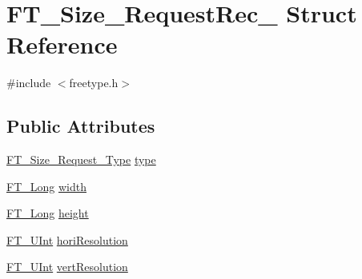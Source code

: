 \hypertarget{struct_f_t___size___request_rec__}{\section{F\-T\-\_\-\-Size\-\_\-\-Request\-Rec\-\_\- Struct Reference}
\label{struct_f_t___size___request_rec__}
}


{\ttfamily \#include $<$freetype.\-h$>$}

\subsection*{Public Attributes}
\begin{DoxyCompactItemize}
\item 
\hyperlink{freetype_8h_ac10a6bdce0674edb378e81f8a19b6867}{F\-T\-\_\-\-Size\-\_\-\-Request\-\_\-\-Type} \hyperlink{struct_f_t___size___request_rec___a7644b04dd2b26c0698df558775320494}{type}
\item 
\hyperlink{fttypes_8h_a7fa72a1f0e79fb1860c5965789024d6f}{F\-T\-\_\-\-Long} \hyperlink{struct_f_t___size___request_rec___a7b044d36af318b053d5e3939eb0d5039}{width}
\item 
\hyperlink{fttypes_8h_a7fa72a1f0e79fb1860c5965789024d6f}{F\-T\-\_\-\-Long} \hyperlink{struct_f_t___size___request_rec___af8142450d8d032e1870d758cdcfa51a9}{height}
\item 
\hyperlink{fttypes_8h_abcb8db4dbf35d2b55a9e8c7b0926dc52}{F\-T\-\_\-\-U\-Int} \hyperlink{struct_f_t___size___request_rec___a3a85704d13561d9db53aa60f7805ec73}{hori\-Resolution}
\item 
\hyperlink{fttypes_8h_abcb8db4dbf35d2b55a9e8c7b0926dc52}{F\-T\-\_\-\-U\-Int} \hyperlink{struct_f_t___size___request_rec___a86601c38d91064b6efe256a9e99c56f4}{vert\-Resolution}
\end{DoxyCompactItemize}


